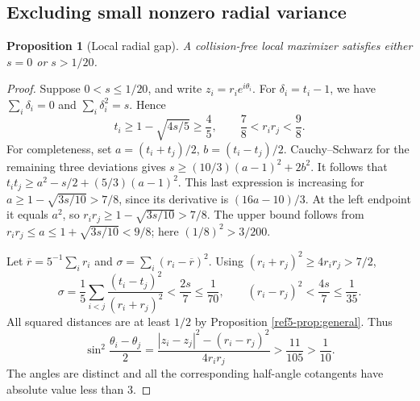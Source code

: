 \documentclass[11pt]{article}
\newtheorem{proposition}[theorem]{Proposition}
\theoremstyle{remark}
\numberwithin{equation}{section}
\begin{document}
\subsection{Excluding small nonzero radial variance}
\begin{proposition}[Local radial gap]\label{ref5-prop:gap}
A collision-free local maximizer satisfies either $s=0$ or $s>1/20$.
\end{proposition}
\begin{proof}
Suppose $0<s\le1/20$, and write $z_i=r_i e^{i\theta_i}$.
For $\delta_i=t_i-1$, we have $\sum_i\delta_i=0$ and
$\sum_i\delta_i^2=s$. Hence
\begin{equation}\label{ref5-eq:local-radii}
 t_i\ge1-\sqrt{4s/5}\ge\frac45,\qquad
 \frac78<r_ir_j<\frac98.
\end{equation}
For completeness, set $a=(t_i+t_j)/2$, $b=(t_i-t_j)/2$.
Cauchy--Schwarz for the remaining three deviations gives
$s\ge(10/3)(a-1)^2+2b^2$.
It follows that
$t_i t_j\ge a^2-s/2+(5/3)(a-1)^2$.
This last expression is increasing for
$a\ge1-\sqrt{3s/10}>7/8$, since its derivative is $(16a-10)/3$.
At the left endpoint it equals $a^2$, so
$r_ir_j\ge1-\sqrt{3s/10}>7/8$.
The upper bound follows from $r_ir_j\le a\le1+\sqrt{3s/10}<9/8$;
here $(1/8)^2>3/200$.

Let $\overline r=5^{-1}\sum_i r_i$ and
$\sigma=\sum_i(r_i-\overline r)^2$.
Using $(r_i+r_j)^2\ge4r_ir_j>7/2$,
\begin{equation}\label{ref5-eq:sigma}
 \sigma=\frac15\sum_{i<j}
       \frac{(t_i-t_j)^2}{(r_i+r_j)^2}
 <\frac{2s}{7}\le\frac1{70},\qquad
 (r_i-r_j)^2<\frac{4s}{7}\le\frac1{35}.
\end{equation}
All squared distances are at least $1/2$ by
Proposition \ref{ref5-prop:general}. Thus
\[
 \sin^2\frac{\theta_i-\theta_j}{2}
 =\frac{|z_i-z_j|^2-(r_i-r_j)^2}{4r_ir_j}
 >\frac{11}{105}>\frac1{10}.
\]
The angles are distinct and all the corresponding half-angle cotangents
have absolute value less than $3$.


\end{proof}
\end{document}

